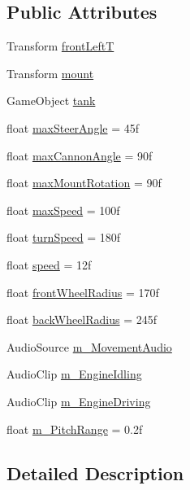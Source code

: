 \subsection*{Public Attributes}
\begin{DoxyCompactItemize}
\item 
Transform \hyperlink{class_simple_controller_a3e884631e0b2702aed7280aeb7d1318b}{front\+LeftT}
\item 
Transform \hyperlink{class_simple_controller_ab8cd8da06ca72dac86817c25830523aa}{mount}
\item 
Game\+Object \hyperlink{class_simple_controller_a36ea93e471504da2007474dd9cb9c824}{tank}
\item 
float \hyperlink{class_simple_controller_ac22f2de2d36b348b224672033b211a19}{max\+Steer\+Angle} = 45f
\item 
float \hyperlink{class_simple_controller_a31ddc11100b66f86de5c65756606433c}{max\+Cannon\+Angle} = 90f
\item 
float \hyperlink{class_simple_controller_ab02ed3d9fa3ae79c6e6f2324a957dafb}{max\+Mount\+Rotation} = 90f
\item 
float \hyperlink{class_simple_controller_a1a32c8c77aa8e6e0a8724becd665013a}{max\+Speed} = 100f
\item 
float \hyperlink{class_simple_controller_a481c0a24a21c34c2190ca128b4d87cfd}{turn\+Speed} = 180f
\item 
float \hyperlink{class_simple_controller_a8146288dd059782ff659eee5194c078e}{speed} = 12f
\item 
float \hyperlink{class_simple_controller_a90ca5274486d08cecaf1d0d8097daf21}{front\+Wheel\+Radius} = 170f
\item 
float \hyperlink{class_simple_controller_ae11fe8f1c7ae299735498f8152993b3e}{back\+Wheel\+Radius} = 245f
\item 
Audio\+Source \hyperlink{class_simple_controller_a800c2ad3e389d8844b398cc5f312f8f1}{m\+\_\+\+Movement\+Audio}
\item 
Audio\+Clip \hyperlink{class_simple_controller_a44c33c316246a4ff3ff87190e2c329f2}{m\+\_\+\+Engine\+Idling}
\item 
Audio\+Clip \hyperlink{class_simple_controller_a0e41064917358dda7eb438dc8cde9060}{m\+\_\+\+Engine\+Driving}
\item 
float \hyperlink{class_simple_controller_aa13a1c40a96cded6e1e1cd6e2a9954b9}{m\+\_\+\+Pitch\+Range} = 0.\+2f
\end{DoxyCompactItemize}


\subsection{Detailed Description}


